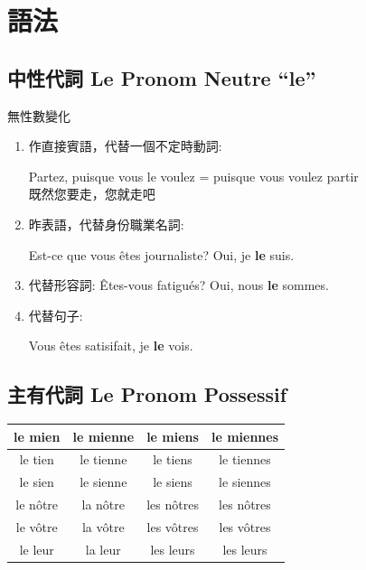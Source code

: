\documentclass{book}
\begin{document}
\chapter{語法}
    \section{中性代詞 Le Pronom Neutre ``le''}
        無性數變化
        \begin{enumerate}
            \item 作直接賓語，代替一個不定時動詞: 
                \begin{center}
                    Partez, puisque vous le voulez = puisque vous voulez partir \\
                    既然您要走，您就走吧
                \end{center}
            \item 昨表語，代替身份職業名詞:
                \begin{center}
                    Est-ce que vous êtes journaliste? Oui, je \textbf{le} suis.
                \end{center}
            \item 代替形容詞: Êtes-vous fatigués? Oui, nous \textbf{le} sommes.
            \item 代替句子: 
                \begin{center}
                    Vous êtes satisifait, je \textbf{le} vois.
                \end{center}
        \end{enumerate}

    \section{主有代詞 Le Pronom Possessif}
        \begin{center}
            \begin{tabular}{|c|c|c|c|}
                \hline
                le mien & le mienne & le miens & le miennes \\
                \hline
                le tien & le tienne & le tiens & le tiennes \\
                \hline
                le sien & le sienne & le siens & le siennes \\
                \hline
                le nôtre & la nôtre & les nôtres & les nôtres \\
                \hline
                le vôtre & la vôtre & les vôtres & les vôtres \\
                \hline
                le leur & la leur & les leurs & les leurs \\
                \hline
            \end{tabular}
        \end{center}
\end{document}
